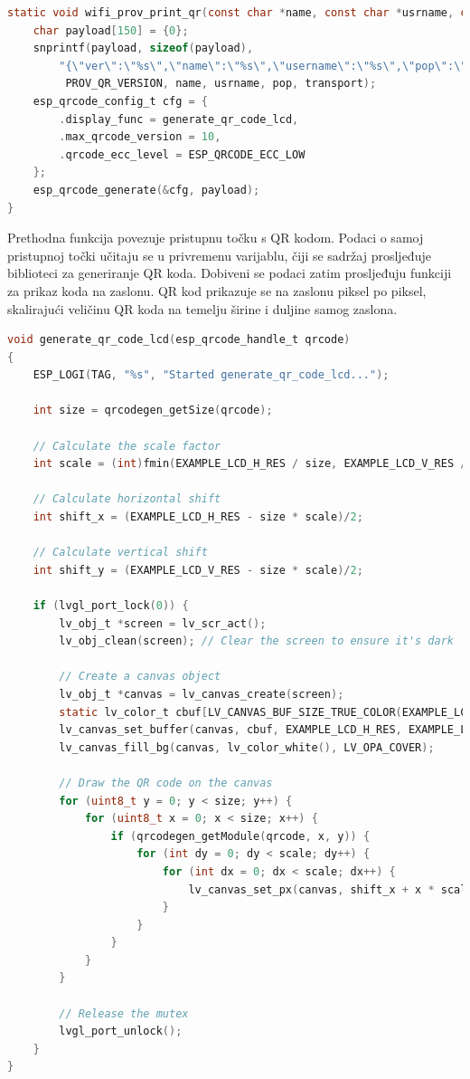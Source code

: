 \begin{lstlisting}[caption={Generiranje QR koda iz pristupne točke}, language=c]
static void wifi_prov_print_qr(const char *name, const char *usrname, const char *pop, const char *transport, lv_disp_t *disp) {
	char payload[150] = {0};
    snprintf(payload, sizeof(payload), 	
    	"{\"ver\":\"%s\",\"name\":\"%s\",\"username\":\"%s\",\"pop\":\"%s\",\"transport\":\"%s\"}",
    	 PROV_QR_VERSION, name, usrname, pop, transport);
    esp_qrcode_config_t cfg = {
		.display_func = generate_qr_code_lcd, 
		.max_qrcode_version = 10, 
		.qrcode_ecc_level = ESP_QRCODE_ECC_LOW
	};
	esp_qrcode_generate(&cfg, payload);
}
\end{lstlisting}

Prethodna funkcija povezuje pristupnu točku s QR kodom. Podaci o samoj pristupnoj točki učitaju se u privremenu varijablu, čiji se sadržaj prosljeđuje biblioteci za generiranje QR koda. Dobiveni se podaci zatim prosljeđuju funkciji za prikaz koda na zaslonu. QR kod prikazuje se na zaslonu piksel po piksel, skalirajući veličinu QR koda na temelju širine i duljine samog zaslona. 

\begin{lstlisting}[caption={Funkcija za prikaz QR koda na zaslonu}, language=c]
void generate_qr_code_lcd(esp_qrcode_handle_t qrcode)
{
	ESP_LOGI(TAG, "%s", "Started generate_qr_code_lcd...");
	
	int size = qrcodegen_getSize(qrcode);
	
	// Calculate the scale factor
	int scale = (int)fmin(EXAMPLE_LCD_H_RES / size, EXAMPLE_LCD_V_RES / size);
	
	// Calculate horizontal shift
	int shift_x = (EXAMPLE_LCD_H_RES - size * scale)/2;
	
	// Calculate vertical shift
	int shift_y = (EXAMPLE_LCD_V_RES - size * scale)/2;
	
	if (lvgl_port_lock(0)) {
		lv_obj_t *screen = lv_scr_act();
		lv_obj_clean(screen); // Clear the screen to ensure it's dark
		
		// Create a canvas object
		lv_obj_t *canvas = lv_canvas_create(screen);
		static lv_color_t cbuf[LV_CANVAS_BUF_SIZE_TRUE_COLOR(EXAMPLE_LCD_H_RES, EXAMPLE_LCD_V_RES)];
		lv_canvas_set_buffer(canvas, cbuf, EXAMPLE_LCD_H_RES, EXAMPLE_LCD_V_RES, LV_IMG_CF_TRUE_COLOR);
		lv_canvas_fill_bg(canvas, lv_color_white(), LV_OPA_COVER);
		
		// Draw the QR code on the canvas
		for (uint8_t y = 0; y < size; y++) {
			for (uint8_t x = 0; x < size; x++) {
				if (qrcodegen_getModule(qrcode, x, y)) {
					for (int dy = 0; dy < scale; dy++) {
						for (int dx = 0; dx < scale; dx++) {
							lv_canvas_set_px(canvas, shift_x + x * scale + dx, shift_y + y * scale + dy, lv_color_black());
						}
					}
				}
			}
		}
		
		// Release the mutex
		lvgl_port_unlock();
	}
}
\end{lstlisting}

